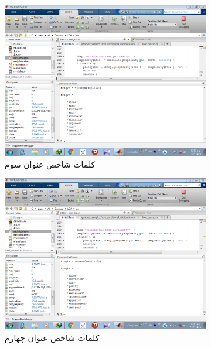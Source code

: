 \documentclass[11.5pt,a4paper]{article}
\begin{document}
\begin{figure}[h]
	\begin{subfigure}{.45\textwidth}
		\includegraphics[scale=0.25]{Imgs/freqk3.png}
		\caption{کلمات شاخص عنوان سوم}
	\end{subfigure}
	\begin{subfigure}{.45\textwidth}
		\includegraphics[scale=0.25]{Imgs/freqk4.png}
		\caption{کلمات شاخص عنوان چهارم}
	\end{subfigure}
	\begin{subfigure}{.45\textwidth}

\end{subfigure}
\end{figure}
\end{document}
